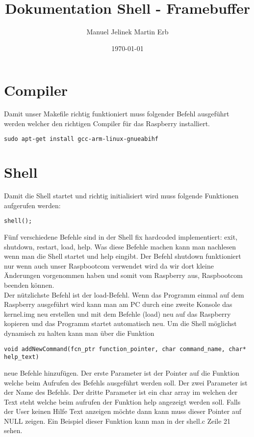 \documentclass[a4paper,10pt]{scrartcl}
\title{Dokumentation Shell - Framebuffer}
\author{Manuel Jelinek Martin Erb}
\date{\today}
\begin{document}
\maketitle
\section*{Compiler}
Damit unser Makefile richtig funktioniert muss folgender Befehl ausgeführt
werden welcher den richtigen Compiler für das Raspberry installiert.
\begin{verbatim} 
sudo apt-get install gcc-arm-linux-gnueabihf 
\end{verbatim}

\section*{Shell}
Damit die Shell startet und richtig initialisiert wird muss folgende
Funktionen aufgerufen werden:
\begin{verbatim} 
shell();
\end{verbatim}
Fünf verschiedene Befehle sind in der Shell fix hardcoded implementiert:
exit, shutdown, restart, load, help.
Was diese Befehle machen kann man nachlesen wenn man die Shell startet und
help eingibt.
Der Befehl shutdown funktioniert nur wenn auch unser Raspbootcom verwendet wird
da wir dort kleine Änderungen vorgenommen
haben und somit vom Raspberry aus, Raspbootcom beenden können.\\
Der nützlichste Befehl ist der load-Befehl. Wenn das Programm einmal auf dem
Raspberry ausgeführt wird kann man am
PC durch eine zweite Konsole das kernel.img neu erstellen und mit dem Befehle
(load) neu auf das Raspberry kopieren und 
das Programm startet automatisch neu.
Um die Shell möglichst dynamisch zu halten kann man über die Funktion
\begin{verbatim} 
void addNewCommand(fcn_ptr function_pointer, char command_name, char* help_text)
\end{verbatim}
neue Befehle hinzufügen. Der erste Parameter ist der Pointer auf die Funktion
welche beim Aufrufen des Befehls ausgeführt werden soll.
Der zwei Parameter ist der Name des Befehls. Der dritte Parameter ist ein char
array im welchen der Text steht welche beim aufrufen der Funktion
help angezeigt werden soll. Falls der User keinen Hilfe Text anzeigen möchte
dann kann muss dieser Pointer auf NULL zeigen.
Ein Beispiel dieser Funktion kann man in der shell.c Zeile 21 sehen.

\newpage
\end{document}
